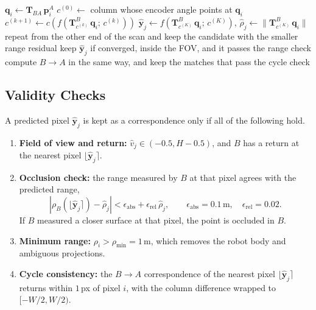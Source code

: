 \begin{algorithm}[h]
\caption{Pixel correspondences $A \rightarrow B$}
\label{alg:pixel_match}
\begin{algorithmic}[1]
    \State $\mathbf{q}_i \gets \mathbf{T}_{BA}\,\mathbf{p}_i^{A}$
    \State $c^{(0)} \gets$ column whose encoder angle points at $\mathbf{q}_i$
        \State $c^{(k+1)} \gets c\left(f(\mathbf{T}^{B}_{c^{(k)}}\,\mathbf{q}_i;\, c^{(k)})\right)$ 
    \EndFor
    \State $\hat{\mathbf{y}}_j \gets f(\mathbf{T}^{B}_{c^{(K)}}\,\mathbf{q}_i;\, c^{(K)})$, \quad $\hat{\rho}_j \gets \|\mathbf{T}^{B}_{c^{(K)}}\,\mathbf{q}_i\|$
        \State repeat from the other end of the scan and keep the candidate with the smaller range residual
    \EndIf
    \State keep $\hat{\mathbf{y}}_j$ if converged, inside the FOV, and it passes the range check
\EndFor
\State compute $B \rightarrow A$ in the same way, and keep the matches that pass the cycle check
\end{algorithmic}
\end{algorithm}

\subsection{Validity Checks}
A predicted pixel $\hat{\mathbf{y}}_j$ is kept as a correspondence only if all of the following hold.
\begin{enumerate}
    \item \textbf{Field of view and return:} $\hat{v}_j \in (-0.5, H - 0.5)$, and $B$ has a return at the nearest pixel $\lfloor \hat{\mathbf{y}}_j \rceil$.
    \item \textbf{Occlusion check:} the range measured by $B$ at that pixel agrees with the predicted range,
    \begin{equation}
        \label{eq:range_check}
        \left|\rho_B\left(\lfloor \hat{\mathbf{y}}_j \rceil\right) - \hat{\rho}_j\right| < \epsilon_{\mathrm{abs}} + \epsilon_{\mathrm{rel}}\,\hat{\rho}_j, \qquad \epsilon_{\mathrm{abs}} = 0.1\,\text{m}, \quad \epsilon_{\mathrm{rel}} = 0.02.
    \end{equation}
    If $B$ measured a closer surface at that pixel, the point is occluded in $B$.
    \item \textbf{Minimum range:} $\rho_i > \rho_{\min} = 1$\,m, which removes the robot body and ambiguous projections.
    \item \textbf{Cycle consistency:} the $B \rightarrow A$ correspondence of the nearest pixel $\lfloor \hat{\mathbf{y}}_j \rceil$ returns within $1$\,px of pixel $i$, with the column difference wrapped to $[-W/2, W/2)$.
\end{enumerate}

